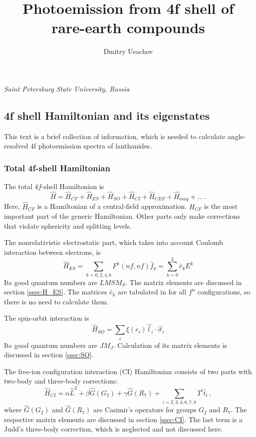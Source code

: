 \documentclass[a4paper,oneside,12pt]{extarticle}
\title{Photoemission from 4f shell of rare-earth compounds}
\author{Dmitry Usachov}
\begin{document}
\maketitle
\begin{center} 
\it Saint Petersburg State University, Russia
\end{center}

\tableofcontents
\newpage
%
\subsection {4f shell Hamiltonian and its eigenstates}

This text is a brief collection of information, which is needed to calculate angle-resolved 4f photoemission spectra of lanthanides.

\subsubsection {Total 4f-shell Hamiltonian}
%
The total $4f$-shell Hamiltonian is
%
\begin{equation}
\hat{H} = \hat{H}_{CF} + \hat{H}_{ES} + \hat{H}_{SO} + \hat{H}_{CI} + \hat{H}_{CEF} + \hat{H}_{mag} +\ldots \,.
\end{equation}
%
Here, $\hat{H}_{CF}$ is a Hamiltonian of a central-field approximation. $\hat{H}_{CF}$ is the most important part of the generic Hamiltonian. Other parts only make corrections that violate sphericity and splitting levels.

The nonrelativistic electrostatic part, which takes into account Coulomb interaction between electrons, is
$$
\hat{H}_{ES} = \sum_{k=0,2,4,6} F^k(nf,nf) \hat{f}_k = \sum_{k=0}^3 \hat{e}_k E^k
$$
%
Its good quantum numbers are $LMSM_S$. The matrix elements are discussed in section \ref{ssec:H_ES}. The matrices $\hat{e}_k$ are tabulated in \cite{NielsonKoster} for all $f^n$ configurations, so there is no need to calculate them.

The spin-orbit interaction is 
$$
\hat{H}_{SO} = \sum_i \xi(r_i) \vec{l}_i \cdot \vec{\sigma}_i
$$
%
Its good quantum numbers are $JM_J$. Calculation of its matrix elements is discussed in section \ref{ssec:SO}.

The free-ion configuration interaction (CI) Hamiltonian consists of two parts with two-body and three-body corrections:
$$
\hat{H}_{CI} = \alpha \hat{L}^2 + \beta \hat{G} (G_2) + \gamma \hat{G} (R_7)
+ \sum_{i=2,3,4,6,7,8} T^i \hat{t}_i \,,
$$
where $\hat{G}(G_2)$ and $\hat{G}(R_7)$ are Casimir's operators for groups $G_2$ and $R_7$. The respective matrix elements are discussed in section \ref{ssec:CI}. The last term is a Judd's three-body correction, which is neglected and not discussed here.
\end{document}
